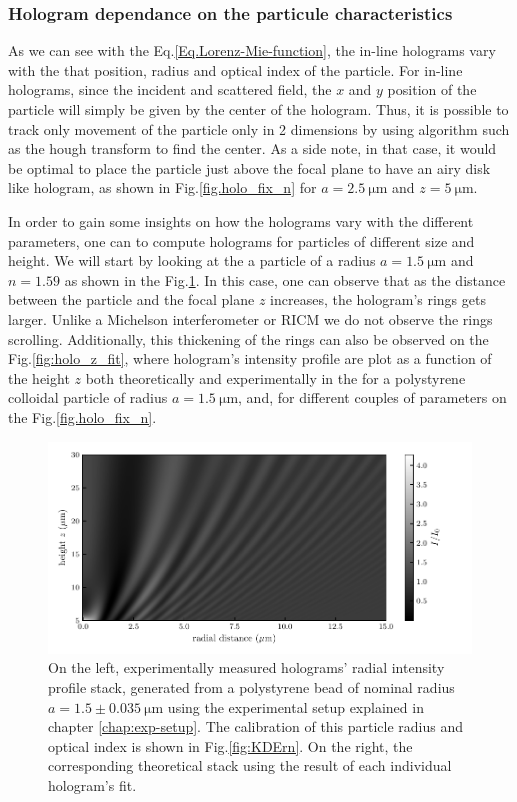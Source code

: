 \subsubsection{Hologram dependance on the particule characteristics}

As we can see with the Eq.\ref{Eq.Lorenz-Mie-function}, the in-line holograms vary with the that position, radius and optical index of the particle. For in-line holograms, since the incident and scattered field, the $x$ and $y$ position of the particle will simply be given by the center of the hologram. Thus, it is possible to track only movement of the particle only in 2 dimensions by using algorithm such as the hough transform to find the center. As a side note, in that case, it would be optimal to place the particle just above the focal plane to have an airy disk like hologram, as shown in Fig.\ref{fig.holo_fix_n} for $a = 2.5 ~ \mathrm{\mu m}$ and $z = 5 ~\mathrm{\mu m}$.

In order to gain some insights on how the holograms vary with the different parameters, one can to compute holograms for particles of different size and height. We will start by looking at the a particle of a radius $a = 1.5 ~ \mathrm{\mu m} $ and $n = 1.59 $ as shown in the Fig.\ref{fig:holo_onlyz}. In this case, one can observe that as the distance between the particle and the focal plane $z$ increases, the hologram's rings gets larger. Unlike a Michelson interferometer or \gls{RICM} we do not observe the rings scrolling. Additionally, this thickening of the rings can also be observed on the Fig.\ref{fig:holo_z_fit}, where hologram's intensity profile are plot as a function of the height $z$ both theoretically and experimentally in the for a polystyrene colloidal particle of radius  $a = 1.5 ~ \mathrm{\mu m} $, and, for different couples of parameters on the Fig.\ref{fig.holo_fix_n}.






\begin{figure}[H]
	\centering
	\includegraphics{02_body/chapter2/images/holo_size_exemple/holos_only_z.pdf}
	\caption{On the left, experimentally measured  holograms' radial intensity profile stack, generated from a polystyrene bead of nominal radius $a = 1.5 \pm 0.035 ~ \mathrm{\mu m} $ using the experimental setup explained in chapter \ref{chap:exp-setup}. The calibration of this particle radius and optical index is shown in Fig.\ref{fig:KDErn}. On the right, the corresponding theoretical stack using the result of each individual hologram's fit.}
	\label{fig:holo_onlyz}
\end{figure}

